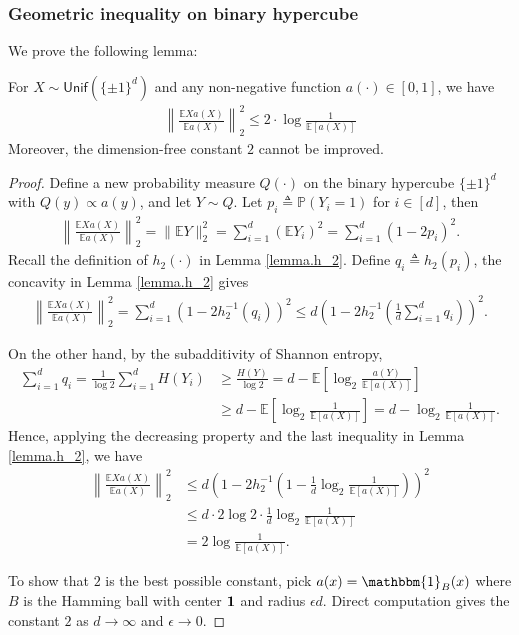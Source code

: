\documentclass[final,12pt]{colt2018} %
\def \bP {\mathbb{P}}
\def \bE {\mathbb{E}}
\begin{document}
\subsubsection{Geometric inequality on binary hypercube}
We prove the following lemma:
\begin{lemma}\label{lemma.hamming}
	For $X\sim \mathsf{Unif}(\{\pm 1\}^d)$ and any non-negative function $a(\cdot)\in [0,1]$, we have
	\begin{align*}
	\left\|\frac{\bE Xa(X)}{\bE a(X)}\right\|_2^2 \le 2\cdot \log \frac{1}{\bE[a(X)]}
	\end{align*}
	Moreover, the dimension-free constant $2$ cannot be improved.
\end{lemma}
\begin{proof}
	Define a new probability measure $Q(\cdot)$ on the binary hypercube $\{\pm 1\}^d$ with $Q(y)\propto a(y)$, and let $Y\sim Q$. Let $p_i\triangleq \bP(Y_i=1)$ for $i\in [d]$, then
	\begin{align*}
	\left\|\frac{\bE Xa(X)}{\bE a(X)}\right\|_2^2 = \|\bE Y\|_2^2 = \sum_{i=1}^d (\bE Y_i)^2 = \sum_{i=1}^d (1-2p_i)^2.
	\end{align*}
	Recall the definition of $h_2(\cdot)$ in Lemma \ref{lemma.h_2}. Define $q_i\triangleq h_2(p_i)$, the concavity in Lemma \ref{lemma.h_2} gives
	\begin{align*}
	\left\|\frac{\bE Xa(X)}{\bE a(X)}\right\|_2^2 = \sum_{i=1}^d (1-2h_2^{-1}(q_i))^2 \le d\left(1-2h_2^{-1}\left(\frac{1}{d}\sum_{i=1}^d q_i\right)\right)^2.
	\end{align*}
	
	On the other hand, by the subadditivity of Shannon entropy,
	\begin{align*}
	\sum_{i=1}^d q_i = \frac{1}{\log 2}\sum_{i=1}^d H(Y_i) &\ge \frac{H(Y)}{\log 2}= d-\bE\left[\log_2 \frac{a(Y)}{\bE[a(X)]}\right] \\
	&\ge d-\bE\left[\log_2 \frac{1}{\bE[a(X)]}\right] = d-\log_2 \frac{1}{\bE[a(X)]}.
	\end{align*}
	Hence, applying the decreasing property and the last inequality in Lemma \ref{lemma.h_2}, we have
	\begin{align*}
	\left\|\frac{\bE Xa(X)}{\bE a(X)}\right\|_2^2&\le d\left(1-2h_2^{-1}\left(1-\frac{1}{d}\log_2\frac{1}{\bE[a(X)]}\right)\right)^2 \\
	&\le d\cdot 2\log 2\cdot \frac{1}{d}\log_2\frac{1}{\bE[a(X)]}\\
	& = 2\log\frac{1}{\bE[a(X)]}.
	\end{align*}
	
	To show that $2$ is the best possible constant, pick $a(x)=\mathbbm{1}_B(x)$ where $B$ is the Hamming ball with center ${\bf 1}$ and radius $\epsilon d$. Direct computation gives the constant $2$ as $d\to\infty$ and $\epsilon\to 0$.
\end{proof}
\end{document}
